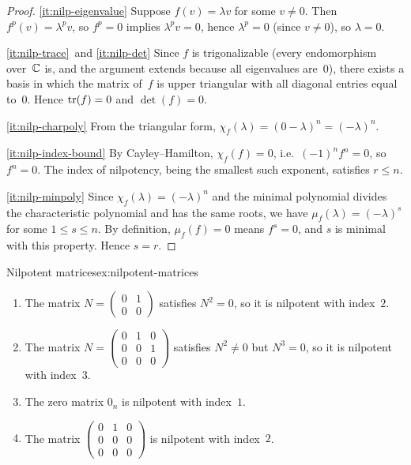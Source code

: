 \begin{proof}
\ref{it:nilp-eigenvalue}\;
Suppose $f(v) = \lambda v$ for some $v \neq 0$.  Then
$f^p(v) = \lambda^p v$, so $f^p = 0$ implies $\lambda^p v = 0$,
hence $\lambda^p = 0$ (since $v \neq 0$), so $\lambda = 0$.

\ref{it:nilp-trace}\ and \ref{it:nilp-det}\;
Since $f$ is trigonalizable (every endomorphism over~${\mathbb{C}}$ is, and
the argument extends because all eigenvalues are~$0$), there
exists a basis in which the matrix of~$f$ is upper triangular with
all diagonal entries equal to~$0$.  Hence $\operatorname{tr}(f) = 0$ and
$\det(f) = 0$.

\ref{it:nilp-charpoly}\;
From the triangular form, $\chi_f(\lambda) = (0 - \lambda)^n =
(-\lambda)^n$.

\ref{it:nilp-index-bound}\;
By Cayley--Hamilton, $\chi_f(f) = 0$, i.e.\ $(-1)^n f^n = 0$, so
$f^n = 0$.  The index of nilpotency, being the smallest such
exponent, satisfies $r \leq n$.

\ref{it:nilp-minpoly}\;
Since $\chi_f(\lambda) = (-\lambda)^n$ and the minimal polynomial
divides the characteristic polynomial and has the same roots, we
have $\mu_f(\lambda) = (-\lambda)^s$ for some $1 \leq s \leq n$.
By definition, $\mu_f(f) = 0$ means $f^s = 0$, and $s$ is minimal
with this property.  Hence $s = r$.
\end{proof}

\begin{example}{Nilpotent matrices}{ex:nilpotent-matrices}
\begin{enumerate}[label=(\alph*)]
  \item The matrix $N = \begin{pmatrix} 0 & 1 \\ 0 & 0 \end{pmatrix}$
    satisfies $N^2 = 0$, so it is nilpotent with index~$2$.

  \item The matrix
    $N = \begin{pmatrix} 0 & 1 & 0 \\ 0 & 0 & 1 \\ 0 & 0 & 0
    \end{pmatrix}$ satisfies $N^2 \neq 0$ but $N^3 = 0$, so it is
    nilpotent with index~$3$.

  \item The zero matrix $0_n$ is nilpotent with index~$1$.

  \item The matrix
    $\begin{pmatrix} 0 & 1 & 0 \\ 0 & 0 & 0 \\ 0 & 0 & 0
    \end{pmatrix}$ is nilpotent with index~$2$.
\end{enumerate}
\end{example}

